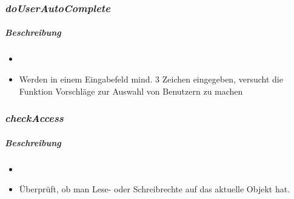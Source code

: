 \subsubsection*{\textit{doUserAutoComplete}}\label{doUserAutoCompleteGDGUI}
\subparagraph{Beschreibung}
\begin{itemize}
	\item[] \noindent{}
	\item[] Werden in einem Eingabefeld mind. 3 Zeichen eingegeben, versucht die Funktion Vorschläge zur Auswahl von Benutzern zu machen
\end{itemize}

\subsubsection*{\textit{checkAccess}}\label{checkAccessGDGUI}
\subparagraph{Beschreibung}
\begin{itemize}
	\item[] \noindent{}
	\item[] Überprüft, ob man Lese- oder Schreibrechte auf das aktuelle Objekt hat.
\end{itemize}